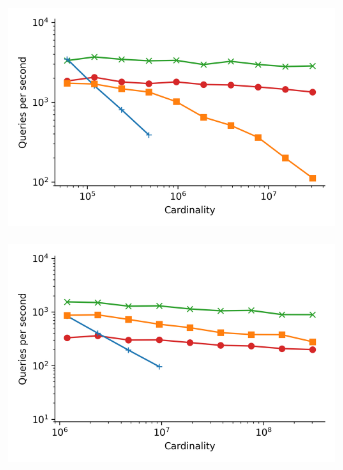 \begin{figure}
    \begin{subfigure}[b]{0.47\textwidth}
        \includegraphics[width=0.95\textwidth]{plots/fashion-mnist_PermutedBall_10_throughput.png}
        \label{fig:results:fashion-mnist-scaling}
    \end{subfigure}%
    \begin{subfigure}[b]{0.47\textwidth}
        \includegraphics[width=0.95\textwidth]{plots/glove-25_PermutedBall_10_throughput.png}
        \label{fig:results:glove-25-scaling}
    \end{subfigure}%
    \vspace{1em}
    \\
    \begin{subfigure}[b]{0.47\textwidth}

\end{subfigure}
\end{figure}
